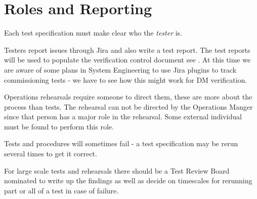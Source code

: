 

\section{Roles and Reporting}

Each test specification must make clear who the {\em tester} is. 


Testers report issues through Jira and also write a test report. 
The test reports will be used to populate the verification control document see . 
At this time we are aware of some plans in System Engineering to use Jira plugins to track commissioning tests - we have to see how this might work for DM verification. 

Operations rehearsals require someone to direct them, these are more about the process than tests. The rehearsal can not be directed by the Operations Manger since that person has a major role in the rehearsal. Some external individual must be found to perform this role. 

Tests and procedures  will sometimes fail - a test specification may be rerun several times to get it correct. 

For large scale tests and rehearsals there should be a Test Review Board nominated to write up the findings as well as decide on timescales for rerunning part or all of a test in case of failure. 

